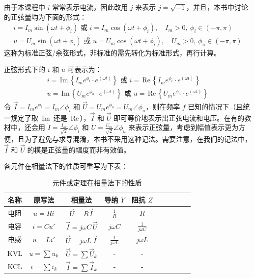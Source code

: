 \documentclass[UTF8]{report}
\def\Im{\,\mathrm{Im}\,}
\def\Re{\,\mathrm{Re}\,}
\theoremstyle{MyLineTheoremStyle} %
\theoremstyle{MyBlockTheoremStyle} %
\theoremstyle{MySubsubsectionStyle} %
\begin{document}
由于本课程中 $i$ 常常表示电流，因此改用 $j$ 来表示 $j = \sqrt{-1}$，并且，本书中讨论的正弦量均为下面的形式：
\begin{gather}
i = I_m \sin (\omega t + \phi_i) \text{\ 或\ } i = I_m \cos (\omega t + \phi_i),\quad I_m > 0,\ \phi_i \in (-\pi, \pi) \\ 
u = U_m \sin (\omega t + \phi_i) \text{\ 或\ } u = U_m \cos (\omega t + \phi_i),\quad U_m > 0,\ \phi_u \in (-\pi, \pi) 
\end{gather}
这称为标准正弦/余弦形式，非标准的需先转化为标准形式，再行计算。

正弦形式下的 $i$ 和 $u$ 可表示为：
\begin{gather}
i = \Im \left\{ I_me^{\phi_i} \cdot e^{(\omega t)} \right\} \text{\ 或\ } i = \Re \left\{ I_me^{\phi_i} \cdot e^{(\omega t)} \right\} \\ 
u = \Im \left\{ U_m e^{\phi_u} \cdot e^{(\omega t)} \right\} \text{\ 或\ } u = \Re \left\{ U_m e^{\phi_u} \cdot e^{(\omega t)} \right\}
\end{gather}
令 $\vec{I} = I_me^{\phi_i} = I_m \angle \phi_i $ 和 $\vec{U} = U_me^{\phi_u} =  U_m \angle \phi_u$，则在频率 $f$ 已知的情况下（且统一规定了取 $\Im$ 还是 $\Re$），$\vec{I}$ 和 $\vec{U}$ 即可等价地表示出正弦电流和电压。在有的教材中，还会用 $\dot{I} = \frac{I_m}{\sqrt{2}} \angle \phi_i $ 和 $\dot{U} = \frac{U_m}{\sqrt{2}} \angle \phi_u$ 来表示正弦量，考虑到幅值表示更为方便，且为了避免与求导混淆，本书不采用这种记法。需要注意，在我们的记法中，$\vec{I}$ 和 $\vec{U}$ 的模是正弦量的幅度而非有效值。

各元件在相量法下的性质可重写为下表：
\begin{table}[H]\centering
    \caption{元件或定理在相量法下的性质}
    \label{元件在相量法下的性质}
\begin{tabular}{cccccccccc}\toprule
    名称 & 原写法 & 相量法 & 导纳 $Y$ & 阻抗 $Z$  \\
    \midrule
    电阻 & $u = Ri$ & $\vec{U} = R \vec{I}$ & $\frac{1}{R}$ & $R$  \\
    电容 & $i = C u'$ & $\vec{I} = j\omega C \,\vec{U}$ & $j \omega C$ & $\displaystyle \frac{1}{j \omega C}$   \\
    电感 & $u = Li'$ & $\vec{U} = j\omega L \,\vec{I}$ & $\displaystyle \frac{1}{j \omega L}$ & $j \omega L$  \\
    KVL & $u = \sum u_k$ & $\vec{U} = \sum \vec{U}_k$ & - & - \\ 
    KCL & $i = \sum i_k$ & $\vec{I} = \sum \vec{I}_k$ & - & - \\ 
    \bottomrule
\end{tabular}
\end{table}
\end{document}
